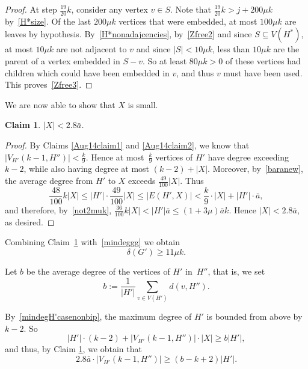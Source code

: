 \documentclass[12pt]{article}
\newtheorem{claim}[theorem]{Claim}
\begin{document}
\begin{proof}
At step $\frac{19}{20} k$, consider any vertex $v\in S$. Note that $\frac{19}{20} k>j+200\mu k$ by~\eqref{H*size}. Of the last $200\mu k$ vertices that were embedded, at most $100\mu k $ are leaves by hypothesis. By~\eqref{H*nonadajcencies}, by~\eqref{Zfree2} and since $S\subseteq V( H^*)$, at most $10\mu k$ are not adjacent to $v$ and since $|S|<10\mu k$,
 less than $10\mu k$ are the parent of a vertex embedded in $S-v$. 
 So at least $80\mu k>0$ of these vertices had children which could have been embedded in $v$, and thus $v$ must have been used. This proves~\eqref{Zfree3}. %
\end{proof}

We are now able to show that $X$ is small.

\begin{claim}
\label{claimwas(60)}
  $|X| < 2.8\bar a$.
\end{claim}

 \begin{proof}
 By Claims \ref{Aug14claim1} and \ref{Aug14claim2}, we know that
$|V_{H'}(k-1, H'')| <\frac{k}{9}$.   Hence at most~$\frac k9$ vertices of $H'$ have degree exceeding $k-2$,
while also having degree at most $(k-2)+|X|$. 
Moreover, by~\eqref{baranew}, the average degree from $H'$ to $X$ exceeds $\frac{49}{100}|X|$. 
Thus $$
\frac{48}{100}k |X| \le |H'|\cdot \frac{49}{100} |X| \le |E(H',X)| < \frac k9 \cdot |X| + |H'|\cdot \bar a,
$$
 and therefore, by~\eqref{not2muk},
 $
\frac{36}{100}k |X| <  |H'|  \bar a \le (1+3\mu ) \bar a k.
$
Hence $|X| < 2.8\bar a$, as desired.
 \end{proof}

Combining Claim~\ref{claimwas(60)} with~\eqref{mindeggg} we obtain
\begin{equation}
    \label{mindegggforreal}
    \delta(G')\ge 11 \mu k.
\end{equation}
 
 Let $b$ be the average degree  of the vertices of $H'$ in~$H''$,
 that is, we set $$b:=\frac{1}{|H'|}\sum_{v\in V(H')}d(v, H'').$$

 By~\eqref{mindegH'casenonbip}, the maximum degree of $H'$ is bounded from above by $k-2$.
       So 
$$|H'|\cdot (k-2)+|V_{H'}(k-1, H'')|\cdot |X|\ge b|H'|,$$
and thus, by Claim \ref{claimwas(60)}, we obtain that
\begin{equation}\label{VH'H'''}
\text{$2.8\bar a \cdot |V_{H'}(k-1, H'')| \ge (b-k+2)|H'|$.}
\end{equation}
\end{document}
